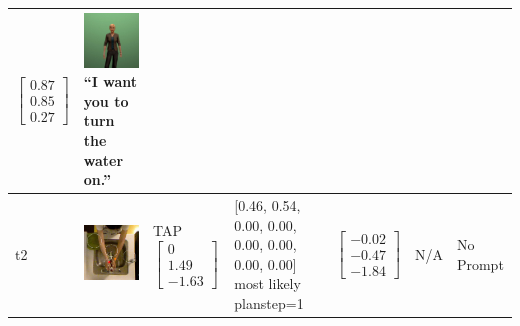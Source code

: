 \begin{longtable}{| V{0.8cm} | V{2.6cm} | V{1.6cm} | V{2.1cm} | V{1.55cm} | V{1.6cm} | V{3.2cm} |}
$\begin{bmatrix}
0.87 \\
0.85 \\
0.27
\end{bmatrix}$ &
\includegraphics[width=2.6cm]{fig/prompt/_i-want-you-to-turn-the-water-on_.jpg}
\linebreak
\footnotesize
``I want you to turn the water on.''
\\ \hline


t2 &
\includegraphics[width=\linewidth]{fig/system/_slow2-tap1_.jpg} &
TAP
\linebreak\linebreak
$\begin{bmatrix}
0 \\
1.49 \\
-1.63
\end{bmatrix}$ &
[0.46, 0.54, 0.00, 0.00, 0.00, 0.00, 0.00, 0.00] most likely planstep=1 &
$\begin{bmatrix}
-0.02 \\
-0.47 \\
-1.84
\end{bmatrix}$ &
N/A &
No Prompt
\\ \hline



\end{longtable}
